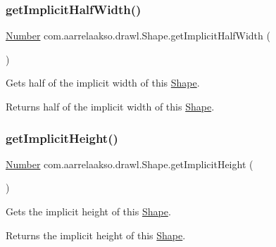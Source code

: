 \subsubsection{\texorpdfstring{get\+Implicit\+Half\+Width()}{getImplicitHalfWidth()}}
{\footnotesize\ttfamily \hyperlink{interfacecom_1_1aarrelaakso_1_1drawl_1_1_number}{Number} com.\+aarrelaakso.\+drawl.\+Shape.\+get\+Implicit\+Half\+Width (\begin{DoxyParamCaption}{ }\end{DoxyParamCaption})\hspace{0.3cm}{\ttfamily [protected]}}



Gets half of the implicit width of this \hyperlink{classcom_1_1aarrelaakso_1_1drawl_1_1_shape}{Shape}. 

\begin{DoxyReturn}{Returns}
half of the implicit width of this \hyperlink{classcom_1_1aarrelaakso_1_1drawl_1_1_shape}{Shape}. 
\end{DoxyReturn}
\mbox{\label{classcom_1_1aarrelaakso_1_1drawl_1_1_shape_a3b0ad73b41fe8c9ae66d20f7fc1de7c9}} 
\subsubsection{\texorpdfstring{get\+Implicit\+Height()}{getImplicitHeight()}}
{\footnotesize\ttfamily \hyperlink{interfacecom_1_1aarrelaakso_1_1drawl_1_1_number}{Number} com.\+aarrelaakso.\+drawl.\+Shape.\+get\+Implicit\+Height (\begin{DoxyParamCaption}{ }\end{DoxyParamCaption})\hspace{0.3cm}{\ttfamily [protected]}}



Gets the implicit height of this \hyperlink{classcom_1_1aarrelaakso_1_1drawl_1_1_shape}{Shape}. 

\begin{DoxyReturn}{Returns}
the implicit height of this \hyperlink{classcom_1_1aarrelaakso_1_1drawl_1_1_shape}{Shape}. 
\end{DoxyReturn}
\mbox{\label{classcom_1_1aarrelaakso_1_1drawl_1_1_shape_af8182545b3b1c85ecaee849474f63c6b}} 
